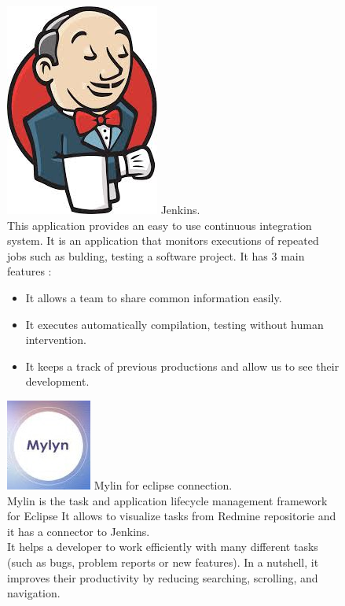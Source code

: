 	\begin{figure}[h]
		\includegraphics[scale=0.1]{Images/jenkins.jpeg} 
		Jenkins. \\
		This application provides an easy to use continuous integration system. 
		It is an application that monitors executions of repeated jobs such as bulding, testing a software project.
		It has 3 main features : 
		\begin{itemize}
			\item It allows a team to share common information easily.
			\item It executes automatically compilation, testing without human intervention.
			\item It keeps a track of previous productions and allow us to see their development. 
		\end{itemize}


		\includegraphics[scale=0.2]{Images/mylin.jpeg} 
		Mylin for eclipse connection. \\
		Mylin is the task and application lifecycle management framework for Eclipse
		It allows to visualize tasks from Redmine repositorie and it has a connector to Jenkins. \\ 
		It helps a developer to work efficiently with many different tasks (such as bugs, problem reports or new features). In a nutshell, it improves their productivity by reducing searching, scrolling, and navigation. \\


\end{figure}
